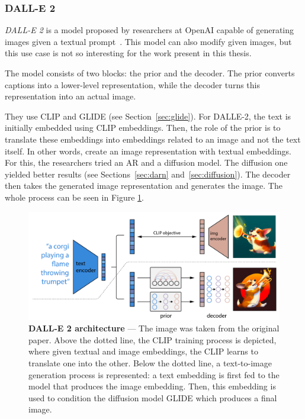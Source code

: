 \subsubsection{DALL-E 2} \label{sec:dall-e-2}

\textit{DALL-E 2} is a model proposed by researchers at OpenAI capable of generating images given a textual prompt~\cite{ramesh_hierarchical_2022}. This model can also modify given images, but this use case is not so interesting for the work present in this thesis.

The model consists of two blocks: the prior and the decoder. The prior converts captions into a lower-level representation, while the decoder turns this representation into an actual image.

They use \ac{CLIP} \cite{radford_learning_2021} and GLIDE (see Section~\ref{sec:glide}). For DALLE-2, the text is initially embedded using \ac{CLIP} embeddings. Then, the role of the prior is to translate these embeddings into embeddings related to an image and not the text itself. In other words, create an image representation with textual embeddings. For this, the researchers tried an \ac{AR} and a diffusion model. The diffusion one yielded better results (see Sections~\ref{sec:darn} and~\ref{sec:diffusion}). The decoder then takes the generated image representation and generates the image. The whole process can be seen in Figure \ref{fig:dall-e-2}.

\begin{figure}[ht]
    \centering
    \includegraphics[width=\textwidth]{figures/2-sota/dall-e-2.png}
    \caption[DALL-E 2 architecture]{\textbf{DALL-E 2 architecture} --- The image was taken from the original paper. Above the dotted line, the \ac{CLIP} training process is depicted, where given textual and image embeddings, the \ac{CLIP} learns to translate one into the other. Below the dotted line, a text-to-image generation process is represented: a text embedding is first fed to the model that produces the image embedding. Then, this embedding is used to condition the diffusion model GLIDE which produces a final image.}
    \label{fig:dall-e-2}
\end{figure}

